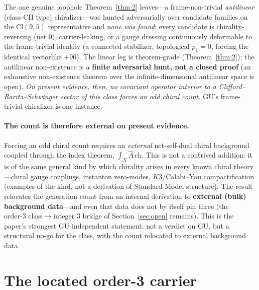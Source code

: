 \documentclass[11pt]{article}
\theoremstyle{definition}
\theoremstyle{remark}
\newcommand{\Cl}{\mathrm{Cl}}
\newcommand{\Ahat}{\hat{A}}
\newcommand{\ch}{\mathrm{ch}}
\begin{document}
The one genuine loophole Theorem~\ref{thm:2} leaves---a frame-non-trivial \emph{antilinear} (class-CII type)
chiralizer---was hunted adversarially over candidate families on the $\Cl(9,5)$ representative and \emph{none was
found}: every candidate is chirality-reversing (net $0$), carrier-leaking, or a gauge dressing continuously
deformable to the frame-trivial identity (a connected stabilizer, topological $p_1=0$, forcing the identical
vectorlike $+96$). The linear leg is theorem-grade (Theorem~\ref{thm:2}); the antilinear non-existence is a
\textbf{finite adversarial hunt, not a closed proof} (an exhaustive non-existence theorem over the
infinite-dimensional antilinear space is open). \emph{On present evidence, then, no covariant operator interior
to a Clifford--Rarita--Schwinger sector of this class forces an odd chiral count.} GU's frame-trivial chiralizer
is one instance.

\paragraph{The count is therefore external on present evidence.} Forcing an odd chiral count requires an
\emph{external} net-self-dual chiral background coupled through the index theorem, $\int_X \Ahat\,\ch$. This is
not a contrived addition: it is of the same general kind by which chirality arises in every known chiral
theory---chiral gauge couplings, instanton zero-modes, $K3$/Calabi--Yau compactification (examples of the kind,
not a derivation of Standard-Model structure). The result relocates the generation count from an internal
derivation to \textbf{external (bulk) background data}---and even that data does not by itself pin three (the
$\text{order-}3\text{ class}\to\text{integer }3$ bridge of Section~\ref{sec:open} remains). This is the paper's
strongest GU-independent statement: not a verdict on GU, but a structural no-go for the class, with the count
relocated to external background data.

\section{The located order-3 carrier}\label{sec:carrier}
\end{document}
